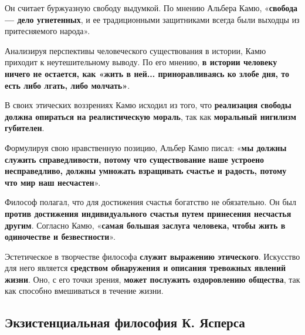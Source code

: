 \documentclass{article}
\begin{document}
\begin{flushleft}
\hfill

Он считает буржуазную свободу выдумкой. По мнению Альбера Камю, «\textbf{свобода — дело угнетенных}, и ее традиционными защитниками всегда были выходцы из притесняемого народа».

\hfill

Анализируя перспективы человеческого существования в истории, Камю приходит к неутешительному выводу. По его мнению, \textbf{в истории человеку ничего не остается, как «жить в ней... приноравливаясь ко злобе дня, то есть либо лгать, либо молчать»}.

\hfill

В своих этических воззрениях Камю исходил из того, что \textbf{реализация свободы должна опираться на реалистическую мораль}, так как \textbf{моральный нигилизм губителен}.

\hfill

Формулируя свою нравственную позицию, Альбер Камю писал: «\textbf{мы должны служить справедливости, потому что существование наше устроено несправедливо, должны умножать взращивать счастье и радость, потому что мир наш несчастен}».

\hfill

Философ полагал, что для достижения счастья богатство не обязательно. Он был \textbf{против достижения индивидуального счастья путем принесения несчастья другим}. Согласно Камю, «\textbf{самая большая заслуга человека, чтобы жить в одиночестве и безвестности}».

\hfill

Эстетическое в творчестве философа \textbf{служит выражению этического}. Искусство для него является \textbf{средством обнаружения и описания тревожных явлений жизни}. Оно, с его точки зрения, \textbf{может послужить оздоровлению общества}, так как способно вмешиваться в течение жизни.

\end{flushleft}


\subsection{Экзистенциальная философия К. Ясперса}
\end{document}
